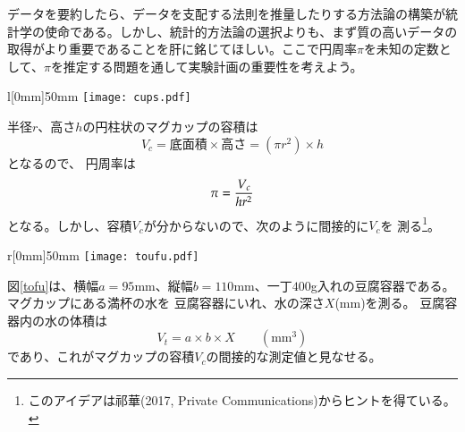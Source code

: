 \pagebreak
\begin{teatime}
データを要約したら、データを支配する法則を推量したりする方法論の構築が統計学の使命である。しかし、統計的方法論の選択よりも、まず質の高いデータの取得がより重要であることを肝に銘じてほしい。ここで円周率$\pi$を未知の定数として、$\pi$を推定する問題を通して実験計画の重要性を考えよう。

\begin{wrapfigure}[11]{l}[0mm]{50mm} 
\vspace*{-\intextsep}
\centering
\texttt{[image: cups.pdf]}%
\caption{同じ高さのマグカップ\label{cup}}
\end{wrapfigure}

半径$r$、高さ$h$の円柱状のマグカップの容積は
$$
V_c = \mbox{底面積} \times \mbox{高さ} = (\pi r^2) \times h 
$$
となるので、
円周率は
\begin{equation}
\pi  = {V_c \over h r^2}
\label{eqn:pi}
\end{equation}
となる。しかし、容積$V_c$が分からないので、次のように間接的に$V_c$を
測る\footnote{このアイデアは祁華(2017, Private Communications)からヒントを得ている。}。

\begin{wrapfigure}[11]{r}[0mm]{50mm} 
\vspace*{-\intextsep}
\centering
\texttt{[image: toufu.pdf]}%
\caption{一丁$400$g入れの豆腐容器\label{tofu}}
\end{wrapfigure}

図\ref{tofu}は、横幅$a=95$mm、縦幅$b=110$mm、一丁$400$g入れの豆腐容器である。マグカップにある満杯の水を
豆腐容器にいれ、水の深さ$X$(mm)を測る。
豆腐容器内の水の体積は
$$
V_t = a\times b\times X \qquad (\mbox{mm}^3)
$$
であり、これがマグカップの容積$V_c$の間接的な測定値と見なせる。


\end{teatime}
